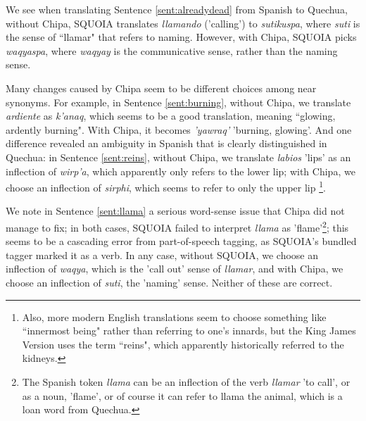 We see when translating Sentence \ref{sent:alreadydead}  from Spanish to
Quechua, without Chipa, SQUOIA translates \emph{llamando} ('calling') to
\emph{sutikuspa}, where \emph{suti} is the sense of ``llamar" that refers to
naming. However, with Chipa, SQUOIA picks \emph{waqyaspa}, where \emph{waqyay}
is the communicative sense, rather than the naming sense.

Many changes caused by Chipa seem to be different choices among near synonyms.
For example, in Sentence \ref{sent:burning}, without Chipa, we translate
\emph{ardiente} as \emph{k'anaq}, which seems to be a good translation, meaning
``glowing, ardently burning". With Chipa, it becomes \emph{'yawraq'} 'burning,
glowing'. And one difference revealed an ambiguity in Spanish that is clearly
distinguished in Quechua: in Sentence \ref{sent:reins}, without Chipa, we
translate \emph{labios} 'lips' as an inflection of \emph{wirp'a}, which
apparently only refers to the lower lip; with Chipa, we choose an inflection of
\emph{sirphi}, which seems to refer to only the upper lip
\footnote{Also, more modern English translations seem to choose something like
``innermost being" rather than referring to one's innards, but the King James
Version uses the term ``reins", which apparently historically referred to the
kidneys.}.

We note in Sentence \ref{sent:llama} a serious word-sense issue that Chipa did
not manage to fix; in both cases, SQUOIA failed to interpret \emph{llama} as
'flame'\footnote{The Spanish token \emph{llama} can be an inflection of the
verb \emph{llamar} 'to call', or as a noun, 'flame', or of course it can refer
to llama the animal, which is a loan word from Quechua.}; this seems to be a
cascading error from part-of-speech tagging, as SQUOIA's bundled tagger marked
it as a verb. In any case, without SQUOIA, we choose an inflection of
\emph{waqya}, which is the 'call out' sense of \emph{llamar}, and with Chipa,
we choose an inflection of \emph{suti}, the 'naming' sense. Neither of these
are correct.

